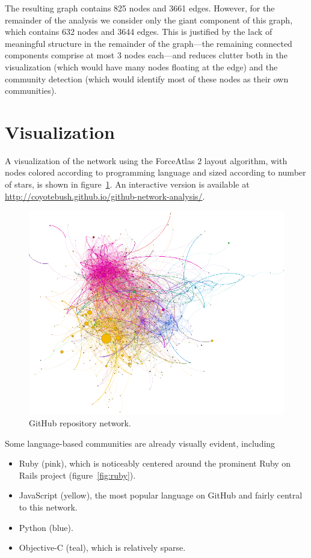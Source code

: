 \documentclass[11pt]{article}
\begin{document}
The resulting graph contains 825 nodes and 3661 edges. However, for the
remainder of the analysis we consider only the giant component of this graph,
which contains 632 nodes and 3644 edges. This is justified by the lack of
meaningful structure in the remainder of the graph---the remaining connected
components comprise at most 3 nodes each---and reduces clutter both in the
visualization (which would have many nodes floating at the edge) and the
community detection (which would identify most of these nodes as their own
communities).

\section{Visualization}
A visualization of the network using the ForceAtlas 2 layout algorithm, with
nodes colored according to programming language and sized according to number of
stars, is shown in figure~\ref{fig:fullnetwork}. An interactive version is
available at \url{http://coyotebush.github.io/github-network-analysis/}.

\begin{figure}[htbp]
    \centering
    \caption{GitHub repository network.}
    \label{fig:fullnetwork}
    \includegraphics{repositories.pdf}
\end{figure}

Some language-based communities are already visually evident, including
\begin{itemize}
    \item Ruby (pink), which is noticeably centered around the prominent Ruby on
        Rails project (figure~\ref{fig:ruby}).
    \item JavaScript (yellow), the most popular language on GitHub and fairly
        central to this network.
    \item Python (blue).
    \item Objective-C (teal), which is relatively sparse.
\end{itemize}
\end{document}
